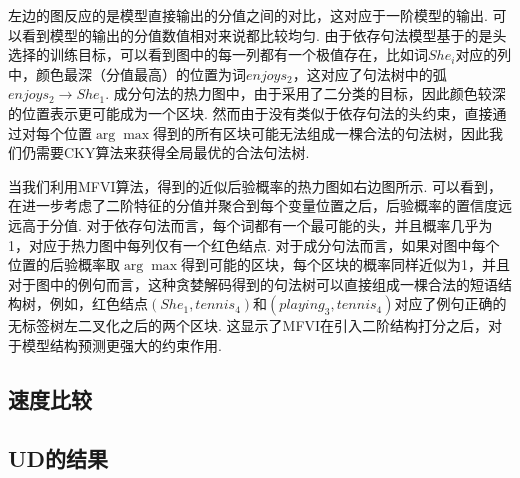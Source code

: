 左边的图反应的是模型直接输出的分值之间的对比，这对应于一阶模型的输出.
可以看到模型的输出的分值数值相对来说都比较均匀.
由于依存句法模型基于的是头选择的训练目标，可以看到图中的每一列都有一个极值存在，比如词$She_i$对应的列中，颜色最深（分值最高）的位置为词$enjoys_2$，这对应了句法树中的弧$enjoys_2\rightarrow She_1$.
成分句法的热力图中，由于采用了二分类的目标，因此颜色较深的位置表示更可能成为一个区块.
然而由于没有类似于依存句法的头约束，直接通过对每个位置$\arg\max$得到的所有区块可能无法组成一棵合法的句法树，因此我们仍需要CKY算法来获得全局最优的合法句法树.

当我们利用MFVI算法，得到的近似后验概率的热力图如右边图所示.
可以看到，在进一步考虑了二阶特征的分值并聚合到每个变量位置之后，后验概率的置信度远远高于分值.
对于依存句法而言，每个词都有一个最可能的头，并且概率几乎为1，对应于热力图中每列仅有一个红色结点.
对于成分句法而言，如果对图中每个位置的后验概率取$\arg\max$得到可能的区块，每个区块的概率同样近似为1，并且对于图中的例句而言，这种贪婪解码得到的句法树可以直接组成一棵合法的短语结构树，例如，红色结点$(She_1,tennis_4)$和$(playing_3,tennis_4)$对应了例句正确的无标签树左二叉化之后的两个区块.
这显示了MFVI在引入二阶结构打分之后，对于模型结构预测更强大的约束作用.


\subsection{速度比较}

\subsection{UD的结果}
